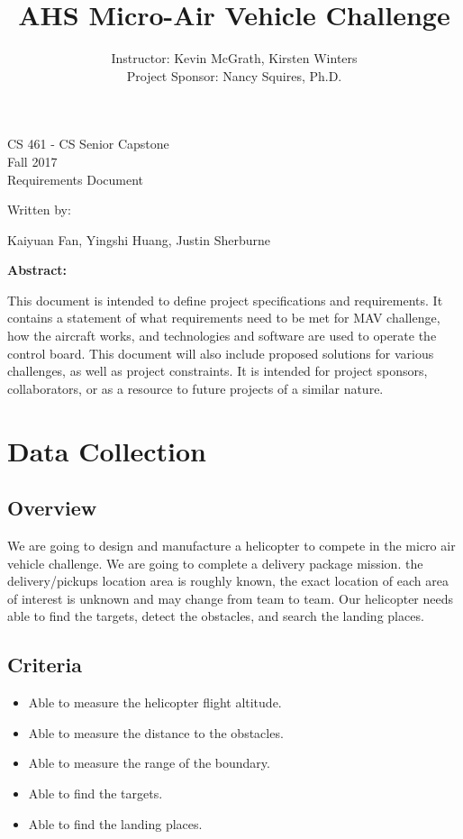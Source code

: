 \documentclass[letterpaper, 10, draftclsnofoot, onecolumn]{IEEEtran}
\date{}
\title{AHS Micro-Air Vehicle Challenge}
\author{ Instructor: Kevin McGrath, Kirsten Winters \\
    Project Sponsor: Nancy Squires, Ph.D.
}
\def\class{CS 461 - CS Senior Capstone}
\def\term{Fall 2017}
\begin{document}
\null  %
\nointerlineskip  %
\vfill
\let\snewpage \newpage
\let\newpage \relax
\maketitle
\begin{center}
\class\\
\term\\
\huge{Requirements Document}\par
\vspace{2mm}
\large{Written by:}\par
\normalsize{Kaiyuan Fan, Yingshi Huang, Justin Sherburne}\par
\vspace{8mm}
\large{\textbf{Abstract:}}\par 
\end{center}
\vspace{2mm}
\normalsize{
This document is intended to define project specifications and requirements. It contains a statement of what requirements need to be met for MAV challenge, how the aircraft works, and technologies and software are used to operate the control board. This document will also include proposed solutions for various challenges, as well as project constraints. It is intended for project sponsors, collaborators, or as a resource to future projects of a similar nature.

}

\let \newpage \snewpage
\vfill 
\break %

\tableofcontents

\section{Data Collection}
\subsection{Overview}
We are going to design and manufacture a helicopter to compete in the micro air vehicle challenge. We are going to complete a delivery package mission. the delivery/pickups location area is roughly known, the exact location of each area of interest is unknown and may change from team to team. Our helicopter needs able to find the targets, detect the obstacles, and search the landing places.


\subsection{Criteria}
\begin{itemize} 
\item Able to measure the helicopter flight altitude.
\item Able to measure the distance to the obstacles.
\item Able to measure the range of the boundary.
\item Able to find the targets.
\item 	Able to find the landing places.

\end{itemize}
\end{document}
